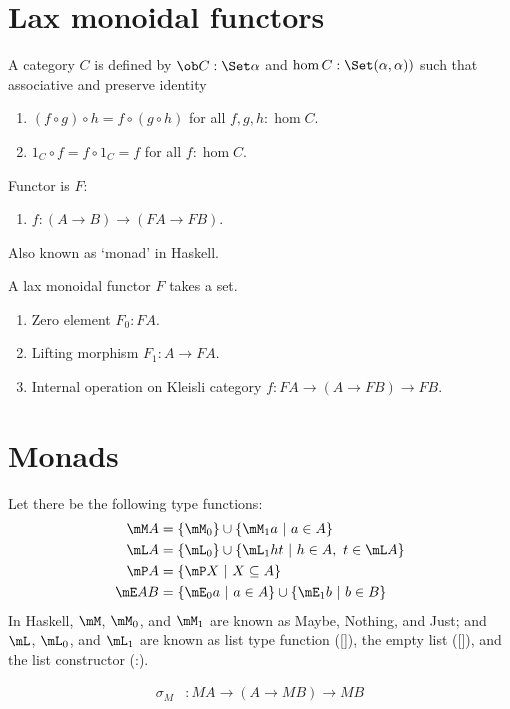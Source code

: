 \section{Lax monoidal functors}

A category $C$ is defined by $\ob C : \Set\alpha$ and $\hom C : \Set(\alpha, \alpha))$ such that
associative and preserve identity
\begin{enumerate}
    \item $(f \circ g) \circ h = f \circ (g \circ h)$ for all $f,g,h : \hom C$.
    \item $1_C \circ f = f \circ 1_C = f$ for all $f : \hom C$.
\end{enumerate}

Functor is $F$:
\begin{enumerate}
    \item $f : (A \to B) \to (FA \to FB)$.
\end{enumerate}

Also known as `monad' in Haskell.

A lax monoidal functor $F$ takes a set.
\begin{enumerate}
    \item Zero element $F_0 : FA$.
    \item Lifting morphism $F_1 : A \to FA$.
    \item Internal operation on Kleisli category $f : FA \to (A \to FB) \to FB$.
\end{enumerate}

\section{Monads}

Let there be the following type functions:
\begin{align}
    \mM A &= \{ \mM_0 \} \cup \{ \mM_1 a ~|~ a \in A \}
 \\ \mL A &= \{ \mL_0 \} \cup \{ \mL_1 h t ~|~ h \in A, ~ t \in \mL A \}
 \\ \mP A &= \{ \mP X ~|~ X \subseteq A \}
\\ \mE AB &= \{ \mE_0 a ~|~ a \in A \} \cup \{ \mE_1 b ~|~ b \in B \}
\end{align}
In Haskell, $\mM$, $\mM_0$, and $\mM_1$ are known as Maybe, Nothing, and Just;
and $\mL$, $\mL_0$, and $\mL_1$ are known as list type function ([]), the empty list ([]), and the list constructor (:).

\begin{align}
    \sigma_M &: MA \to (A \to MB) \to MB
\end{align}

